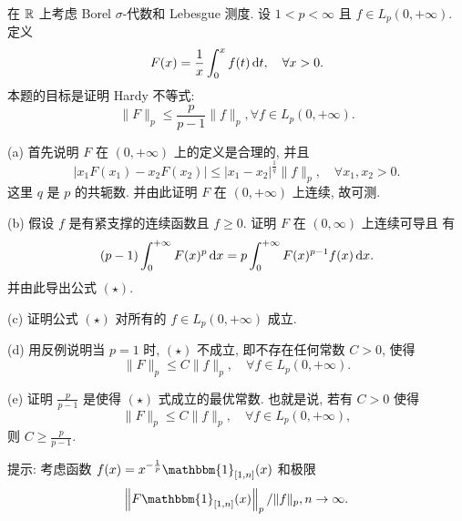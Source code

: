 \begin{exercise}
    在 $\mathbb{R}$ 上考虑 Borel $\sigma$-代数和 Lebesgue 测度. 设 $1<p<\infty$ 且 $f \in L_{p}(0,+\infty)$. 定义
    \[
    F(x)=\frac{1}{x} \int_{0}^{x} f(t) \mathop{}\!\mathrm{d} t, \quad \forall x>0.
    \]
    本题的目标是证明 Hardy 不等式:
    \begin{equation}
    \|F\|_{p} \leq \frac{p}{p-1}\|f\|_{p}, \forall f \in L_{p}(0,+\infty). \tag{$\star$}
    \end{equation}

    (a) 首先说明 $F$ 在 $(0,+\infty)$ 上的定义是合理的, 并且
    \[
    |x_1 F(x_1)-x_2 F(x_2)| \leq|x_1-x_2|^{\frac{1}{q}}\|f\|_{p}, \quad \forall x_{1}, x_{2}>0.
    \]
    这里 $q$ 是 $p$ 的共轭数. 并由此证明 $F$ 在 $(0,+\infty)$ 上连续, 故可测.

    (b) 假设 $f$ 是有紧支撑的连续函数且 $f \geq 0$. 证明 $F$ 在 $(0, \infty)$ 上连续可导且 有
    \[
    (p-1)\int_{0}^{+\infty} F(x)^{p}\mathop{}\!\mathrm{d} x = p\int_{0}^{+\infty} F(x)^{p-1}f(x)\mathop{}\!\mathrm{d} x.
    \]
    并由此导出公式 $(\star)$.

    (c) 证明公式 $(\star)$ 对所有的 $f \in L_{p}(0,+\infty)$ 成立.

    (d) 用反例说明当 $p=1$ 时, $(\star)$ 不成立, 即不存在任何常数 $C>0$, 使得
    \[
    \|F\|_{p} \leq C\|f\|_{p}, \quad \forall f \in L_{p}(0,+\infty).
    \]

    (e) 证明 $\frac{p}{p-1}$ 是使得 $(\star)$ 式成立的最优常数. 也就是说, 若有 $C>0$ 使得
    \[
    \|F\|_{p} \leq C\|f\|_{p}, \quad \forall f \in L_{p}(0,+\infty),
    \]
    则 $C\geq\frac{p}{p-1}$.

    提示: 考虑函数 $f(x)=x^{-\frac{1}{p}} \mathbbm{1}_{[1, n]}(x)$ 和极限
    \[
    \left\|F \mathbbm{1}_{[1, n]}(x)\right\|_{p} /\|f\|_{p}, n \rightarrow \infty.
    \]
\end{exercise}

